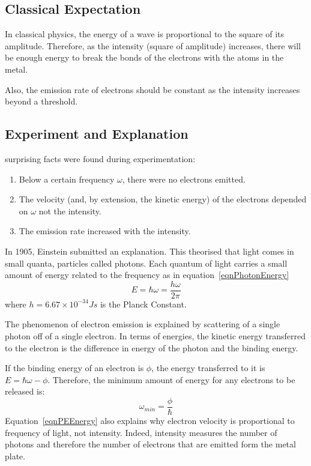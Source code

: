\documentclass[../Main.tex]{subfiles}
\begin{document}
\subsection{Classical Expectation}
In classical physics, the energy of a wave is proportional to the square of its amplitude. Therefore, as the intensity (square of amplitude) increases, there will be enough energy to break the bonds of the electrons with the atoms in the metal.

Also, the emission rate of electrons should be constant as the intensity increases beyond a threshold.
\subsection{Experiment and Explanation}
 surprising facts were found during experimentation:
\begin{enumerate}
    \item Below a certain frequency $\omega$, there were no electrons emitted. \label{PEFinding1}
    \item The velocity (and, by extension, the kinetic energy) of the electrons depended on $\omega$ not the intensity.\label{PEFinding2}
    \item The emission rate increased with the intensity.\label{PEFinding3}
\end{enumerate}
In 1905, Einstein submitted an explanation. This theorised that light comes in small quanta, particles called photons. Each quantum of light carries a small amount of energy related to the frequency as in equation~\ref{eqnPhotonEnergy}
\begin{equation}
    E = \hbar \omega = \frac{h \omega}{2\pi}
    \label{eqnPhotonEnergy}
\end{equation}
where $h = 6.67\times 10^{-34} J s$ is the Planck Constant.

The phenomenon of electron emission is explained by scattering of a single photon off of a single electron. In terms of energies, the kinetic energy transferred to the electron is the difference in energy of the photon and the binding energy.

If the binding energy of an electron is $\phi$, the energy transferred to it is $E = \hbar \omega - \phi$. Therefore, the minimum amount of energy for any electrons to be released is:
\begin{equation}
    \omega_{min} = \frac{\phi}{\hbar}
    \label{eqnPEEnergy}
\end{equation}
Equation~\ref{eqnPEEnergy} also explains why electron velocity is proportional to frequency of light, not intensity. Indeed, intensity measures the number of photons and therefore the number of electrons that are emitted form the metal plate.
\end{document}

